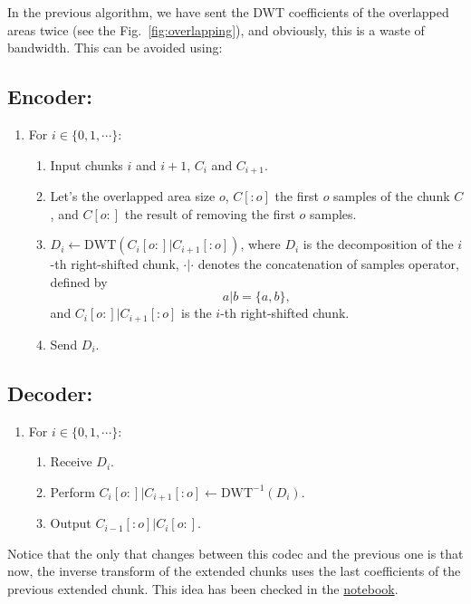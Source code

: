 In the previous algorithm, we have sent the DWT coefficients of the
overlapped areas twice (see the Fig.~\ref{fig:overlapping}), and
obviously, this is a waste of bandwidth. This can be avoided using:

\subsection*{Encoder:}
\begin{enumerate}
\item For $i\in\{0,1,\cdots\}$:
  \begin{enumerate}
  \item Input chunks $i$ and $i+1$, $C_i$ and $C_{i+1}$.
  \item Let's the overlapped area size $o$, $C[:o]$ the first $o$
    samples of the chunk $C$, and $C[o:]$ the result of removing the
    first $o$ samples.
  \item $D_i \leftarrow \text{DWT}(C_i[o:]|C_{i+1}[:o])$, where $D_i$ is the
    decomposition of the $i$-th right-shifted chunk, $\cdot|\cdot$ denotes
    the concatenation of samples operator, defined by
    \begin{equation}
      a|b = \{a,b\},
    \end{equation}
    and $C_i[o:]|C_{i+1}[:o]$ is the $i$-th right-shifted chunk.
    \item Send $D_i$.
  \end{enumerate}
\end{enumerate}

\subsection*{Decoder:}
\begin{enumerate}
\item For $i\in\{0,1,\cdots\}$:
  \begin{enumerate}
  \item Receive $D_i$.
  \item Perform $C_i[o:]|C_{i+1}[:o]\leftarrow\text{DWT}^{-1}(D_i)$.
  \item Output $C_{i-1}[:o]|C_i[o:]$.
  \end{enumerate}
\end{enumerate}

Notice that the only that changes between this codec and the previous
one is that now, the inverse transform of the extended chunks uses the
last coefficients of the previous extended chunk. This idea has been
checked in the
\href{https://github.com/Tecnologias-multimedia/intercom/blob/master/docs/overlapped_DWT_II.ipynb}{notebook}.

